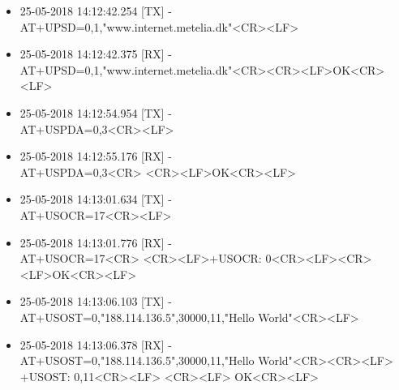 \begin{itemize}
	\item 25-05-2018 14:12:42.254 [TX] -\\
	AT+UPSD=0,1,"www.internet.metelia.dk"<CR><LF>
	\item 25-05-2018 14:12:42.375 [RX] -\\
	AT+UPSD=0,1,"www.internet.metelia.dk"<CR>\newline <CR><LF>\newline OK<CR><LF>
	\item 25-05-2018 14:12:54.954 [TX] -\\
	AT+USPDA=0,3<CR><LF>
	\item 25-05-2018 14:12:55.176 [RX] -\\
	AT+USPDA=0,3<CR> \newline <CR><LF>\newline OK<CR><LF>
	\item 25-05-2018 14:13:01.634 [TX] -\\
	AT+USOCR=17<CR><LF>
	\item 25-05-2018 14:13:01.776 [RX] -\\
	AT+USOCR=17<CR> \newline <CR><LF>\newline +USOCR: 0<CR><LF>\newline <CR><LF>\newline OK<CR><LF>
	\item 25-05-2018 14:13:06.103 [TX] -\\
	AT+USOST=0,"188.114.136.5",30000,11,"Hello World"<CR><LF>
	\item 25-05-2018 14:13:06.378 [RX] -\\
	AT+USOST=0,"188.114.136.5",30000,11,"Hello World"<CR>\newline <CR><LF> \newline +USOST: 0,11<CR><LF> \newline <CR><LF> \newline OK<CR><LF>
\end{itemize}

